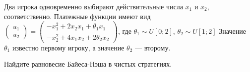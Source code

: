 \begin{problem}

Два игрока одновременно выбирают действительные числа  $x_{1} $  и  $x_{2} $, соответственно.
Платежные функции имеют вид\\
 $\left(\begin{array}{l} {u_{1} } \\ {u_{2} } \end{array}\right)=\left(\begin{array}{l} {-x_{1}^{2} +2x_{2} x_{1} +\theta _{1} x_{1} } \\ {-x_{2}^{2} +4x_{1} x_{2} +2\theta _{2} x_{2} } \end{array}\right)$, где  $\theta _{1} \sim U\left[0;2\right]$,  $\theta _{2} \sim U\left[1;2\right]$
Значение  $\theta _{1} $  известно первому игроку, а значение  $\theta _{2} $  --- второму.

Найдите равновесие Байеса-Нэша в чистых стратегиях.

\begin{sol}

\end{sol}
\end{problem}




